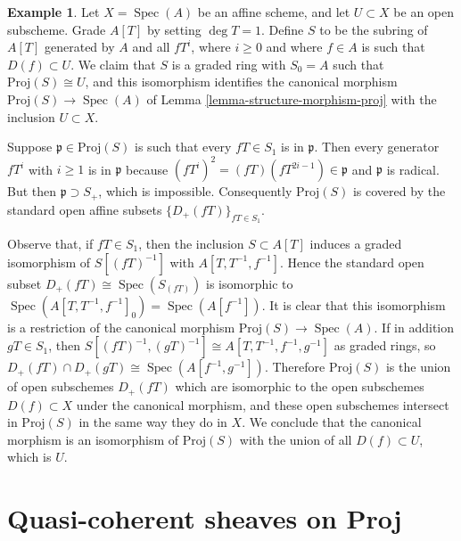 \documentclass{stacks-project}
\theoremstyle{plain}
\theoremstyle{definition}
\newtheorem{example}[subsection]{Example}
\theoremstyle{remark}
\numberwithin{equation}{subsection}
\def\Spec{\mathop{\mathrm{Spec}}}
\begin{document}
\begin{example}
\label{example-open-subset-proj}
Let $X = \Spec(A)$ be an affine scheme, and let $U \subset X$
be an open subscheme.  Grade $A[T]$ by setting $\deg T = 1$.  Define $S$
to be the subring of $A[T]$ generated by $A$ and all $fT^i$, where $i \ge 0$
and where $f \in A$ is such that $D(f) \subset U$.  We claim that $S$
is a graded ring with $S_0 = A$ such that $\text{Proj}(S) \cong U$,
and this isomorphism identifies the canonical morphism
$\text{Proj}(S) \to \Spec(A)$ of Lemma \ref{lemma-structure-morphism-proj}
with the inclusion $U \subset X$.

\medskip\noindent
Suppose $\mathfrak p \in \text{Proj}(S)$ is such that every $fT \in S_1$
is in $\mathfrak p$.  Then every generator $fT^i$ with $i \ge 1$
is in $\mathfrak p$ because $(fT^i)^2 = (fT)(fT^{2i-1}) \in \mathfrak p$
and $\mathfrak p$ is radical.  But then $\mathfrak p \supset S_+$, which
is impossible. Consequently $\text{Proj}(S)$ is covered by the standard
open affine subsets $\{D_+(fT)\}_{fT \in S_1}$.

\medskip\noindent
Observe that, if $fT \in S_1$, then the inclusion $S \subset A[T]$
induces a graded isomorphism of $S[(fT)^{-1}]$ with $A[T, T^{-1}, f^{-1}]$.
Hence the standard open subset $D_+(fT) \cong \Spec(S_{(fT)})$
is isomorphic to $\Spec(A[T, T^{-1}, f^{-1}]_0) = \Spec(A[f^{-1}])$.
It is clear that this isomorphism is a restriction of the canonical morphism
$\text{Proj}(S) \to \Spec(A)$.  If in addition $gT \in S_1$, then
$S[(fT)^{-1}, (gT)^{-1}] \cong A[T, T^{-1}, f^{-1}, g^{-1}]$
as graded rings, so $D_+(fT) \cap D_+(gT) \cong \Spec(A[f^{-1}, g^{-1}])$.
Therefore $\text{Proj}(S)$ is the union of open subschemes $D_+(fT)$
which are isomorphic to the open subschemes $D(f) \subset X$
under the canonical morphism, and these open subschemes intersect
in $\text{Proj}(S)$ in the same way they do in $X$.
We conclude that the canonical morphism is an isomorphism of
$\text{Proj}(S)$ with the union of all $D(f) \subset U$, which is $U$.
\end{example}





















\section{Quasi-coherent sheaves on Proj}
\label{section-quasi-coherent-proj}
\end{document}
